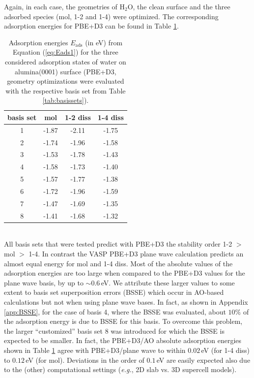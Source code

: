 \documentclass[11pt,DIV=13,BCOR=5mm,a4paper,headinclude]{scrbook}
\begin{document}
Again, in each case, the geometries of H$_2$O, the clean surface and the three adsorbed species (mol, 1-2 and 1-4) were optimized.
The corresponding adsorption energies for PBE+D3 can be found in Table \ref{tab:basisset-results-PBE+D3}.
\begin{table}[!h]
  \centering
   \caption{Adsorption energies $E_\textrm{ads}$ (in eV) from Equation (\ref{eq:Eads1}) for the three considered adsorption states of water on alumina(0001) surface (PBE+D3, geometry optimizations were evaluated with the respective basis set from Table \ref{tab:basissets}).}
  \begin{tabular}{c|ccc}
  \toprule
  basis set & mol & 1-2 diss & 1-4 diss \\\midrule
  1 &-1.87 &-2.11 &-1.75 \\
  2 &-1.74 &-1.96 &-1.58 \\
  3 &-1.53 &-1.78 &-1.43 \\
  4 &-1.58 &-1.73 &-1.40 \\
  5 &-1.57 &-1.77 &-1.38 \\
  6 &-1.72 &-1.96 &-1.59 \\
  7 &-1.47 &-1.69 &-1.35 \\
  8 &-1.41 &-1.68 &-1.32 \\\bottomrule  
  \end{tabular}
  \label{tab:basisset-results-PBE+D3}
\end{table}
\\

All basis sets that were tested predict with PBE+D3 the stability order 1-2 $>$ mol $>$ 1-4.
In contrast the VASP PBE+D3 plane wave calculation predicts an almost equal energy for mol and 1-4 diss.
Most of the absolute values of the adsorption energies are too large when compared to the PBE+D3 values for the plane wave basis, by up to $\sim0.6\,$eV.
We attribute these larger values to some extent to basis set superposition errors (BSSE) which occur in AO-based calculations but not when using plane wave bases.
In fact, as shown in Appendix \ref{app:BSSE}, for the case of basis 4, where the BSSE was evaluated, about $10\%$ of the adsorption energy is due to BSSE for this basis.
To overcome this problem, the larger ``customized'' basis set 8 was introduced for which the BSSE is expected to be smaller.
In fact, the PBE+D3/AO absolute adsorption energies shown in Table \ref{tab:basisset-results-PBE+D3} agree with PBE+D3/plane wave to within $0.02\,$eV (for 1-4 diss) to $0.12\,$eV (for mol).
Deviations in the order of $0.1\,$eV are easily expected also due to the (other) computational settings (\textit{e.g.}, 2D slab vs. 3D supercell models).
\end{document}
